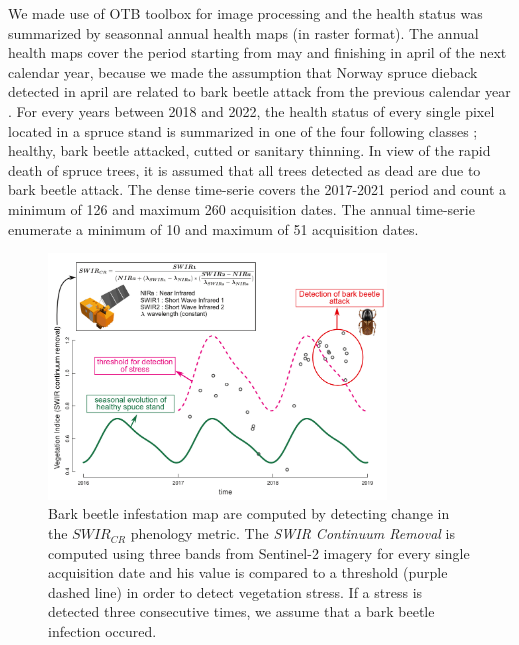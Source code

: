 \documentclass[3p,procedia]{elsarticle}
\begin{document}
We made use of OTB toolbox \citep{grizonnet_2017_OTB} for image processing and the health status was summarized by seasonnal annual health maps (in raster format).
The annual health maps cover the period starting from may and finishing in april of the next calendar year, because we made the assumption that Norway spruce dieback detected in april are related to bark beetle attack from the previous calendar year \citep{muller_features_2022}.
For every years between 2018 and 2022, the health status of every single pixel located in a spruce stand is summarized in one of the four following classes ; healthy, bark beetle attacked, cutted or sanitary thinning.
In view of the rapid death of spruce trees, it is assumed that all trees detected as dead are due to bark beetle attack.
The dense time-serie covers the 2017-2021 period and count a minimum of 126 and maximum 260 acquisition dates. 
The annual time-serie enumerate a minimum of 10 and maximum of 51 acquisition dates. 
 


\begin{figure}[htbp] 
	\centering
	\includegraphics[width=0.8\textwidth]{fctHarmo.png}
	\caption{Bark beetle infestation map are computed by detecting change in the $SWIR_{CR}$ phenology metric. The \textit{SWIR Continuum Removal} is computed using three bands from Sentinel-2 imagery for every single acquisition date and his value is compared to a threshold (purple dashed line) in order to detect vegetation stress. If a stress is detected three consecutive times, we assume that a bark beetle infection occured.}
	\label{fig:harmo}
\end{figure}
\end{document}
